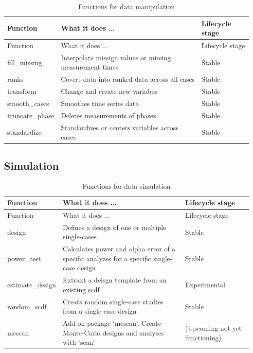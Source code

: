 \documentclass[
  letterpaper,
  DIV=11,
  numbers=noendperiod]{scrreprt}
\begin{document}
\hypertarget{tbl-functions-manipulation}{}
\begin{longtable}[]{@{}lll@{}}
\caption{\label{tbl-functions-manipulation}Functions for data
manipulation}\tabularnewline
\toprule()
Function & What it does ... & Lifecycle stage \\
\midrule()
\endfirsthead
\toprule()
Function & What it does ... & Lifecycle stage \\
\midrule()
\endhead
fill\_missing & Interpolate missign values or missing measurement times
& Stable \\
ranks & Covert data into ranked data across all cases & Stable \\
transform & Change and create new variabes & Stable \\
smooth\_cases & Smoothes time series data & Stable \\
truncate\_phase & Deletes measurements of phases & Stable \\
standardize & Standardizes or centers variables across cases & Stable \\
\bottomrule()
\end{longtable}

\hypertarget{simulation}{%
\subsection{Simulation}\label{simulation}}

\hypertarget{tbl-functions-simulation}{}
\begin{longtable}[]{@{}lll@{}}
\caption{\label{tbl-functions-simulation}Functions for data
simulation}\tabularnewline
\toprule()
Function & What it does ... & Lifecycle stage \\
\midrule()
\endfirsthead
\toprule()
Function & What it does ... & Lifecycle stage \\
\midrule()
\endhead
design & Defines a design of one or multiple single-cases & Stable \\
power\_test & Calculates power and alpha error of a specific analyzes
for a specific single-case design & Stable \\
estimate\_design & Extraxt a deisgn template from an existing scdf &
Experimental \\
random\_scdf & Creats random single-case studies from a single-case
design & Stable \\
mcscan & Add-on package `mcscan`. Create Monte-Carlo designs and
analyses with `scan` & (Upcoming not yet functioning) \\
\bottomrule()
\end{longtable}
\end{document}
